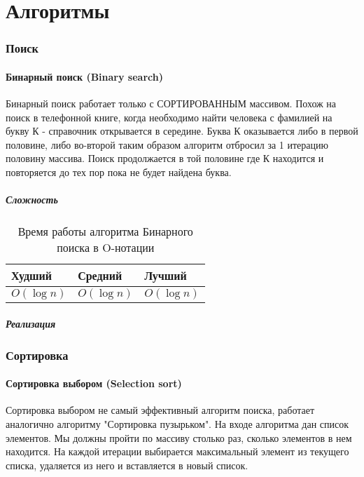 \part{Алгоритмы}
		
	\section{Поиск}
		\subsection{Бинарный поиск (Binary search) \label{search:binary}}
		
		Бинарный поиск работает только с СОРТИРОВАННЫМ массивом. Похож на поиск в телефонной книге, когда необходимо найти человека с фамилией на букву К - справочник открывается в середине. Буква К оказывается либо в первой половине, либо во-второй таким образом алгоритм отбросил за 1 итерацию половину массива.
		Поиск продолжается в той половине где К находится и повторяется до тех пор пока не будет найдена буква.
		
		\subsubsection{Сложность}
\begin{table}[h!]
\caption{Время работы алгоритма Бинарного поиска в O-нотации}
\begin{tabular}{|l|l|l|}
\hline
Худший & Средний & Лучший \\ \hline
$ O(\log n) $ & $ O(\log n) $ & $ O(\log n) $ \\\hline
\end{tabular}
\end{table}

		\subsubsection{Реализация}
\linenumbers
{}
\nolinenumbers	
		
	\section{Сортировка}
		\subsection{Сортировка выбором (Selection sort) \label{sort:select}}
		
		Сортировка выбором не самый эффективный алгоритм поиска, работает аналогично алгоритму "Сортировка пузырьком". 
		На входе алгоритма дан список элементов. Мы должны пройти по массиву столько раз, сколько элементов в нем находится. На каждой итерации выбирается максимальный элемент из текущего списка, удаляется из него и вставляется в новый список.
		
